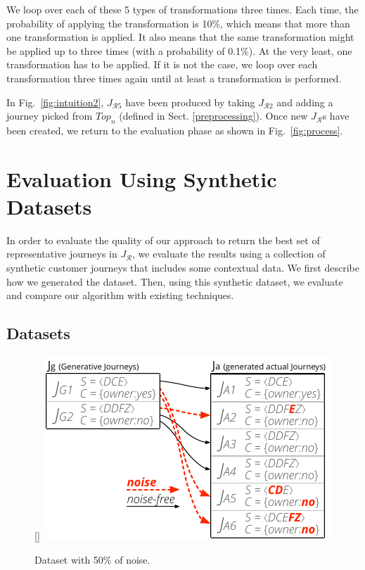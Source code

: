 \documentclass[runningheads]{llncs}
\begin{document}
{{We loop over each of these 5 types of transformations three times. Each time, the probability of applying the transformation is 10\%, which means that more than one transformation is applied. It also means that the same transformation might be applied up to three times (with a probability of 0.1\%). At the very least, one transformation has to be applied. If it is not the case, we loop over each transformation three times again until at least a transformation is performed.

In Fig.~\ref{fig:intuition2}, $J_{\mathcal{R}5}$ have been produced by taking $J_{\mathcal{R}2}$ and adding a journey picked from $Top_n$ (defined in Sect. \ref{preprocessing}). Once new $J_{\mathcal{R}}$s have been created, we return to the evaluation phase as shown in Fig.~\ref{fig:process}. 

\section{Evaluation Using Synthetic Datasets}
In order to evaluate the quality of our approach to return the best set of representative journeys in $J_{\mathcal{R}}$, we evaluate the results using a collection of synthetic customer journeys that includes some contextual data. We first describe how we generated the dataset. Then, using this synthetic dataset, we evaluate and compare our algorithm with existing techniques. 

\subsection{Datasets}


\begin{figure}
  \begin{center}
    \raisebox{0pt}[\dimexpr{}\baselineskip\relax]{\
\includegraphics[width=0.42\columnwidth]{05_schema/dataset.pdf}
    }
  \end{center}
  \vspace{-5pt}
  \caption{Dataset with 50\% of noise.}
  \label{fig:dataset}
\end{figure} 


}}
\end{document}
